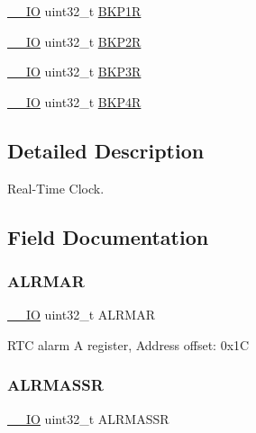 \begin{DoxyCompactItemize}
\item 
\hyperlink{core__sc300_8h_aec43007d9998a0a0e01faede4133d6be}{\+\_\+\+\_\+\+IO} uint32\+\_\+t \hyperlink{struct_r_t_c___type_def_af85290529fb82acef7c9fcea3718346c}{B\+K\+P1R}
\item 
\hyperlink{core__sc300_8h_aec43007d9998a0a0e01faede4133d6be}{\+\_\+\+\_\+\+IO} uint32\+\_\+t \hyperlink{struct_r_t_c___type_def_aaa251a80daa57ad0bd7db75cb3b9cdec}{B\+K\+P2R}
\item 
\hyperlink{core__sc300_8h_aec43007d9998a0a0e01faede4133d6be}{\+\_\+\+\_\+\+IO} uint32\+\_\+t \hyperlink{struct_r_t_c___type_def_a0b1eeda834c3cfd4d2c67f242f7b2a1c}{B\+K\+P3R}
\item 
\hyperlink{core__sc300_8h_aec43007d9998a0a0e01faede4133d6be}{\+\_\+\+\_\+\+IO} uint32\+\_\+t \hyperlink{struct_r_t_c___type_def_ab13e106cc2eca92d1f4022df3bfdbcd7}{B\+K\+P4R}
\end{DoxyCompactItemize}


\subsection{Detailed Description}
Real-\/\+Time Clock. 

\subsection{Field Documentation}
\mbox{\label{struct_r_t_c___type_def_ac005b1a5bc52634d5a34578cc9d2c3f6}} 
\subsubsection{\texorpdfstring{A\+L\+R\+M\+AR}{ALRMAR}}
{\footnotesize\ttfamily \hyperlink{core__sc300_8h_aec43007d9998a0a0e01faede4133d6be}{\+\_\+\+\_\+\+IO} uint32\+\_\+t A\+L\+R\+M\+AR}

R\+TC alarm A register, Address offset\+: 0x1C \mbox{\label{struct_r_t_c___type_def_a61282fa74cede526af85fd9d20513646}} 
\subsubsection{\texorpdfstring{A\+L\+R\+M\+A\+S\+SR}{ALRMASSR}}
{\footnotesize\ttfamily \hyperlink{core__sc300_8h_aec43007d9998a0a0e01faede4133d6be}{\+\_\+\+\_\+\+IO} uint32\+\_\+t A\+L\+R\+M\+A\+S\+SR}

